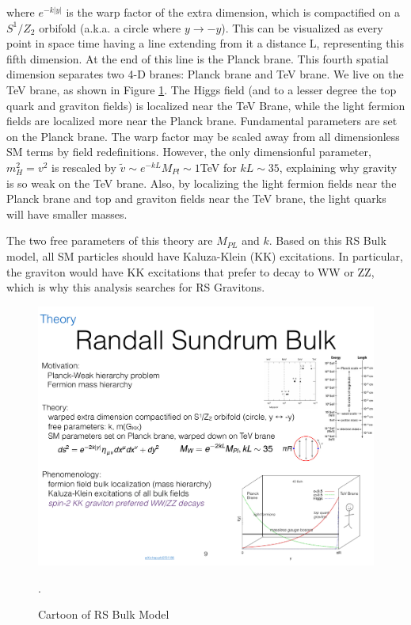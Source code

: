 where $e^{-k|y|}$ is the warp factor of the extra dimension, which is compactified on a $S^{1}/Z_{2}$ orbifold (a.k.a. a circle where $y \rightarrow -y$). This can be visualized as every point in space time having a line extending from it a distance L, representing this fifth dimension. At the end of this line is the Planck brane. This fourth spatial dimension separates two 4-D branes: Planck brane and TeV brane. We live on the TeV brane, as shown in Figure \ref{fig:RS_cartoon}. The Higgs field (and to a lesser degree the top quark and graviton fields) is localized near the TeV Brane, while the light fermion fields are localized more near the Planck brane. Fundamental parameters are set on the Planck brane. The warp factor may be scaled away from all dimensionless SM terms by field redefinitions. However, the only dimensionful parameter, $m_{H}^{2}=v^{2}$ is rescaled by $\tilde{v}\sim e^{-kL}M_{Pl}\sim 1$TeV for $kL\sim 35$, explaining why gravity is so weak on the TeV brane. Also, by localizing the light fermion fields near the Planck brane and top and graviton fields near the TeV brane, the light quarks will have smaller masses. 

The two free parameters of this theory are $M_{PL}$ and $k$. Based on this RS Bulk model, all SM particles should have Kaluza-Klein (KK) excitations. In particular, the graviton would have KK excitations that prefer to decay to WW or ZZ, which is why this analysis searches for RS Gravitons. 


\begin{figure}[h!]
  \centering
  \includegraphics[width=\hsize]{figures/Theory/RS_cartoon.pdf}
  \caption{Cartoon of RS Bulk Model}. 
  \label{fig:RS_cartoon}
\end{figure}
\FloatBarrier


